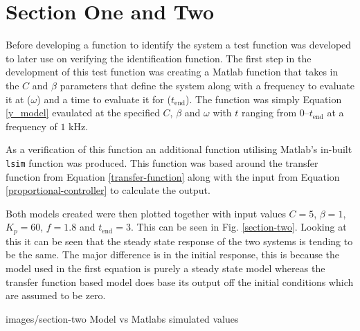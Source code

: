 \section*{Section One and Two}

Before developing a function to identify the system a test function was
developed to later use on verifying the identification function.  The first step
in the development of this test function was creating a Matlab function that
takes in the $C$ and $\beta$ parameters that define the system along with a
frequency to evaluate it at ($\omega$) and a time to evaluate it for
($t_\text{end}$).  The function was simply Equation \ref{y_model} evaulated at
the specified $C$, $\beta$ and $\omega$ with $t$ ranging from
$0$--$t_\text{end}$ at a frequency of $1$ kHz.

As a verification of this function an additional function utilising Matlab's
in-built \texttt{lsim} function was produced.  This function was based around
the transfer function from Equation \ref{transfer-function} along with the input
from Equation \ref{proportional-controller} to calculate the output.

Both models created were then plotted together with input values $C = 5$, $\beta
= 1$, $K_p = 60$, $f = 1.8$ and $t_\text{end} = 3$.  This can be seen in Fig.
\ref{section-two}.  Looking at this it can be seen that the steady state response of
the two systems is tending to be the same.  The major difference is in the
initial response, this is because the model used in the first equation is purely
a steady state model whereas the transfer function based model does base its
output off the initial conditions which are assumed to be zero.

              {images/section-two}
              {Model vs Matlabs simulated values\label{section-two}}
